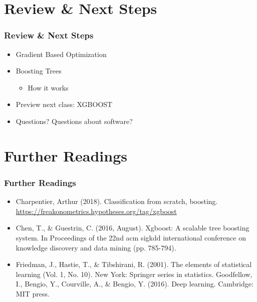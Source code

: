 \documentclass[
  shownotes,
  xcolor={svgnames},
  hyperref={colorlinks,citecolor=DarkBlue,linkcolor=DarkRed,urlcolor=DarkBlue}
  , aspectratio=169]{beamer}
\begin{document}
\section{Review
 \& Next Steps}
\begin{frame}
\frametitle{Review \& Next Steps}
  
\begin{itemize} 
    \item Gradient Based Optimization
    \medskip
    \item Boosting Trees
    \begin{itemize}
      \item How it works
    \end{itemize}
    \item Preview next class: XGBOOST
    \medskip  
    \item Questions? Questions about software? 

\end{itemize}
\end{frame}
\section{Further Readings}
\begin{frame}
\frametitle{Further Readings}

\begin{itemize}

  \item Charpentier, Arthur (2018). Classification from scratch, boosting. \url{https://freakonometrics.hypotheses.org/tag/xgboost}
  \medskip
  \item Chen, T., \& Guestrin, C. (2016, August). Xgboost: A scalable tree boosting system. In Proceedings of the 22nd acm sigkdd international conference on knowledge discovery and data mining (pp. 785-794).
  \medskip
  \item Friedman, J., Hastie, T., \& Tibshirani, R. (2001). The elements of statistical learning (Vol. 1, No. 10). New York: Springer series in statistics.
  \medskip
  \medskip Goodfellow, I., Bengio, Y., Courville, A., \& Bengio, Y. (2016). Deep learning. Cambridge: MIT press.

  
\end{itemize}

\end{frame}





\end{document}
